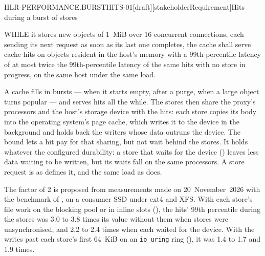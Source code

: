 \begin{requirement}{HLR-PERFORMANCE.BURSTHITS-01}[draft][stakeholderRequirement]{Hits during a burst of stores}


  WHILE it stores new objects of 1~MiB over 16 concurrent connections, each
  sending its next request as soon as its last one completes, the cache
  shall serve cache hits on objects resident in the host's memory with a
  99th-percentile latency of at most twice the 99th-percentile latency of
  the same hits with no store in progress, on the same host under the same
  load.

  A cache fills in bursts --- when it starts empty, after a purge, when a
  large object turns popular --- and serves hits all the while. The stores
  then share the proxy's processors and the host's storage device with the
  hits: each store copies its body into the operating system's page cache,
  which writes it to the device in the background and holds back the
  writers whose data outruns the device. The bound lets a hit pay for that
  sharing, but not wait behind the stores. It holds whatever the configured
  durability: a store that waits for the device
  () leaves less data waiting to be
  written, but its waits fall on the same processors. A store request is as
   defines it, and the same load as
   does.

  The factor of 2 is proposed from measurements made on 20~November~2026
  with the benchmark of , on a consumer
  SSD under ext4 and XFS. With each store's file work on the blocking pool
  or in inline slots (), the hits' 99th
  percentile during the stores was 3.0 to 3.8 times its value without them
  when stores were unsynchronised, and 2.2 to 2.4 times when each waited for
  the device. With the writes past each store's first 64~KiB on an
  \texttt{io\_uring} ring (), it was 1.4 to
  1.7 and 1.9 times.


\end{requirement}

